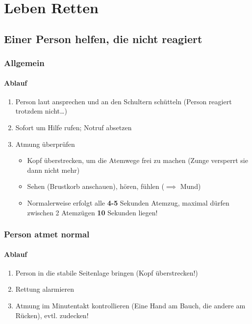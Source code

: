 \part{Leben Retten}

\chapter{Einer Person helfen, die nicht reagiert}

\section{Allgemein}
\subsection*{Ablauf}
\begin{enumerate}
    \item Person laut ansprechen und an den Schultern schütteln (Person reagiert trotzdem nicht\dots)
    \item Sofort um Hilfe rufen; Notruf absetzen
    \item Atmung überprüfen
    \begin{itemize}
        \item Kopf überstrecken, um die Atemwege frei zu machen (Zunge versperrt sie dann nicht mehr)
        \item Sehen (Brustkorb anschauen), hören, fühlen ($\implies$ Mund)
        \item Normalerweise erfolgt alle \textbf{4-5} Sekunden Atemzug, maximal dürfen zwischen 2 Atemzügen \textbf{10} Sekunden liegen!
    \end{itemize}
\end{enumerate}

\section{Person atmet normal}

\subsection*{Ablauf}
\begin{enumerate}
    \item Person in die stabile Seitenlage bringen (Kopf überstrecken!)
    \item Rettung alarmieren
    \item Atmung im Minutentakt kontrollieren (Eine Hand am Bauch, die andere am Rücken), evtl. zudecken!
\end{enumerate}

